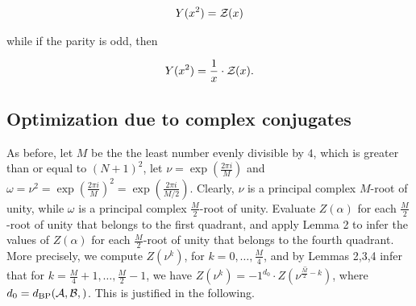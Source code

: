 \begin{align}
\label{eq:ffttwo:evenY}
Y(x^2) = \emZ{}
\end{align}

while if the parity is odd, then

\begin{align}
\label{eq:ffttwo:oddY}
Y(x^2) = \frac{1}{x} \cdot \emZ{}.
\end{align}

\subsection{Optimization due to complex conjugates}
\label{subsec:ffttwo:compconj}

As before, let $M$ be the the least number evenly divisible by $4$, which is
greater than or equal to $(N+1)^2$, let $\nu = \exp(\frac{2 \pi i}{M})$
and $\omega=\nu^2 = \exp(\frac{2 \pi i}{M})^2 =
\exp(\frac{2 \pi i}{M/2})$. Clearly, $\nu$ is a principal complex
$M$-root of unity, while $\omega$ is a principal complex $\frac{M}{2}$-root
of unity. Evaluate $Z(\alpha)$ for each $\frac{M}{2}$-root of unity
that belongs to the first quadrant, and apply Lemma 2 to infer the values
of $Z(\alpha)$ for each $\frac{M}{2}$-root of unity that belongs to the
fourth quadrant. More precisely,
we compute $Z(\nu^k)$, for $k=0,\dots,\frac{M}{4}$, and by Lemmas 2,3,4 infer
that for $k=\frac{M}{4}+1,\dots,\frac{M}{2}-1$, we have
$Z(\nu^{k})= -1^{d_0} \cdot \overline{Z(\nu^{\frac{M}{2}-k})}$, where
$d_0 = \dBP{\strA,\strB}$. This is justified in the following.

